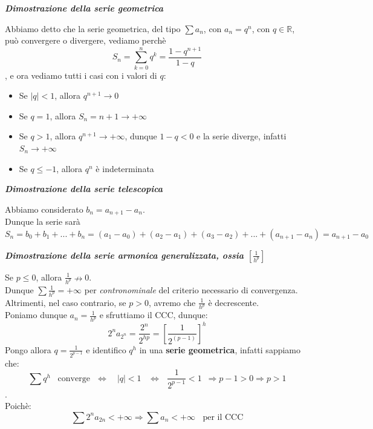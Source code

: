 \documentclass{article}
\theoremstyle{definition}
\newcommand{\R}{\mathbb{R}}
\begin{document}
\begin{center}
    \textbf{\textit{Dimostrazione della serie geometrica}}
\end{center}
Abbiamo detto che la serie geometrica, del tipo $\sum a_n$, con $a_n=q^n$, con $q \in \R$, può convergere o divergere, vediamo perchè
\\
\[S_n=\sum_{k=0}^n q^k = \frac{1-q^{n+1}}{1-q}\], e ora vediamo tutti i casi con i valori di $q$:
\begin{itemize}
    \item Se $|q| < 1$, allora $q^{n+1} \to 0$
    \item Se $q = 1$, allora $S_n = n + 1 \to +\infty$
    \item Se $q > 1$, allora $q^{n+1} \to +\infty$, dunque $1-q <0$ e la serie diverge, infatti $S_n \to +\infty$
    \item Se $q \leqslant -1$, allora $q^n$ è indeterminata
\end{itemize}
\newpage
\begin{center}
    \textbf{\textit{Dimostrazione della serie telescopica}}
\end{center}
Abbiamo considerato $b_n=a_{n+1}-a_n$.
\\
Dunque la serie sarà $S_n=b_0+b_1+...+b_n=(a_1-a_0)+(a_2-a_1)+(a_3-a_2)+...+(a_{n+1}-a_n)= a_{n+1}-a_0$
\begin{center}
    \textbf{\textit{Dimostrazione della serie armonica generalizzata, ossia $[\frac{1}{h^p}]$}}
\end{center}
Se $p \leqslant 0$, allora $\frac{1}{h^p} \nrightarrow 0$.
\\
Dunque $\sum \frac{1}{h^p} = +\infty$ per \textit{contronominale} del criterio necessario di convergenza.
\\
Altrimenti, nel caso contrario, se $p > 0$, avremo che $\frac{1}{h^p}$ è decrescente.
\\
Poniamo dunque $a_n=\frac{1}{h^p}$ e sfruttiamo il CCC, dunque:
\begin{equation}
    2^na_{2^n}=\frac{2^n}{2^{hp}}=\left[\frac{1}{2^{(p-1)}}\right]^h
\end{equation}
Pongo allora $q=\frac{1}{2^{p-1}}$ e identifico $q^h$ in una \textbf{serie geometrica}, infatti sappiamo che:
\begin{equation}
    \sum q^h \,\,\,\,\, \mbox{converge} \,\,\,\, \Leftrightarrow \,\,\,\,\,\, |q| < 1 \,\,\,\,\, \Leftrightarrow \,\,\,\, \frac{1}{2^{p-1}}<1 \,\,\, \Longrightarrow p-1 > 0 \Longrightarrow p > 1
\end{equation}.
\\
Poichè:
\begin{equation}
    \sum 2^n a_{2n} < +\infty \Longrightarrow \sum a_n < +\infty \,\,\,\,\ \mbox{per il CCC}
\end{equation}
\end{document}
